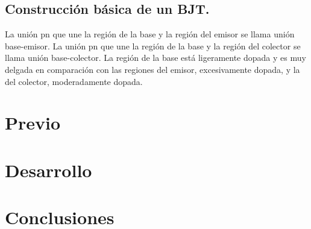 \documentclass{mylib/reporteConCalif}
\begin{document}

\subsection{Construcción básica de un BJT.}

La unión pn que une la región de la base y la región del emisor se llama unión base-emisor.
La unión pn que une la región de la base y la región del colector se llama unión base-colector.
La región de la base está ligeramente dopada y es muy delgada en comparación con las regiones del emisor, excesivamente dopada, y la del colector, moderadamente dopada.



\newpage
\section{Previo}




\newpage
\section{Desarrollo}


\section{Conclusiones}
\end{document}

